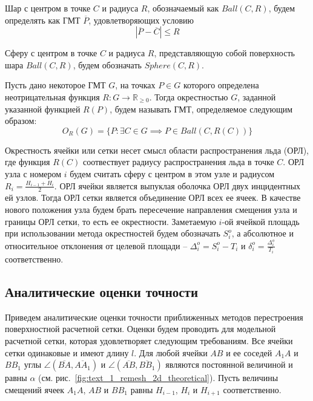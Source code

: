 Шар с центром в точке $C$ и радиуса $R$, обозначаемый как $Ball(C, R)$, будем определять как ГМТ $\overline{P}$, удовлетворяющих условию
\begin{equation}
	|\overline{P} - \overline{C}| \le R
\end{equation}

Сферу с центром в точке $C$ и радиуса $R$, представляющую собой поверхность шара $Ball(C, R)$, будем обозначать $Sphere(C, R)$.

\begin{definition}
Пусть дано некоторое ГМТ\label{abbr:gmt-2} $G$, на точках $P \in G$ которого определена неотрицательная функция $R: G \rightarrow \mathbb{R}_{\ge 0}$.
Тогда окрестностью $G$, заданной указанной функцией $R(P)$, будем называть ГМТ, определяемое следующим образом:
\begin{equation}
	O_R(G) = \{ P: \exists C \in G \implies P \in Ball(C, R(C)) \}
\end{equation}
\end{definition}

Окрестность ячейки или сетки несет смысл области распространения льда (ОРЛ\label{abbr:orl-1}), где функция $R(C)$ соотвествует радиусу распространения льда в точке $C$.
ОРЛ узла с номером $i$ будем считать сферу с центром в этом узле и радиусом $R_i = \frac{H_{i - 1} + H_i}{2}$.
ОРЛ ячейки является выпуклая оболочка ОРЛ двух инцидентных ей узлов.
Тогда ОРЛ сетки является объединение ОРЛ всех ее ячеек.
В качестве нового положения узла будем брать пересечение направления смещения узла и границы ОРЛ сетки, то есть ее окрестности.
Заметаемую $i$-ой ячейкой площадь при использовании метода окрестностей будем обозначать $S_i^o$, а абсолютное и относительное отклонения от целевой площади -- $\Delta_i^o = S_i^o - T_i$ и $\delta_i^o = \frac{\Delta_i^o}{T_i}$ соответственно.


\subsection{Аналитические оценки точности}

Приведем аналитические оценки точности приближенных методов перестроения поверхностной расчетной сетки.
Оценки будем проводить для модельной расчетной сетки, которая удовлетворяет следующим требованиям.
Все ячейки сетки одинаковые и имеют длину $l$.
Для любой ячейки $AB$ и ее соседей $A_1A$ и $BB_1$ углы $\angle (\overline{BA}, \overline{AA_1})$ и $\angle (\overline{AB}, \overline{BB_1})$ являются постоянной величиной и равны $\alpha$ (см. рис.~\ref{fig:text_1_remesh_2d_theoretical}).
Пусть величины смещений ячеек $A_1A$, $AB$ и $BB_1$ равны $H_{i - 1}$, $H_i$ и $H_{i + 1}$ соответственно.

